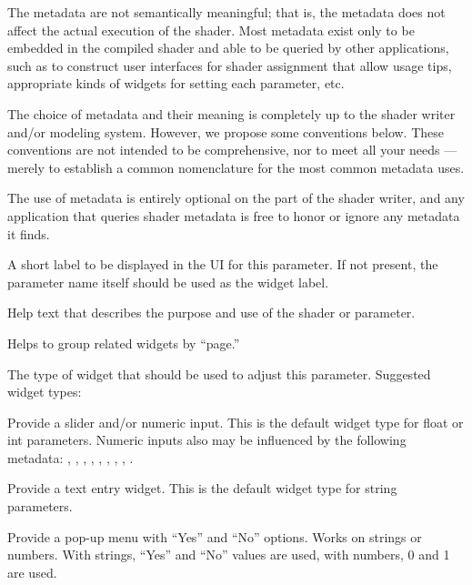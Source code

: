\documentclass[11pt,letterpaper]{book}
\begin{document}
The metadata are not semantically meaningful; that is, the metadata does
not affect the actual execution of the shader.  Most metadata exist only
to be embedded in the compiled shader and able to be queried by other
applications, such as to construct user interfaces for shader assignment
that allow usage tips, appropriate kinds of widgets for setting each
parameter, etc.  

The choice of metadata and their meaning is completely up to the shader
writer and/or modeling system.  However, we propose some conventions
below.  These conventions are not intended to be comprehensive, nor to
meet all your needs --- merely to establish a common nomenclature for
the most common metadata uses.

The use of metadata is entirely optional on the part of the shader
writer, and any application that queries shader metadata is free to
honor or ignore any metadata it finds.

A short label to be displayed in the UI for this parameter.  If not
present, the parameter name itself should be used as the widget label.
\apiend

Help text that describes the purpose and use of the shader or parameter.
\apiend

Helps to group related widgets by ``page.''
\apiend

The type of widget that should be used to adjust this parameter.
Suggested widget types:

\vspace{12pt}
Provide a slider and/or numeric input. This is the default widget type
for {\cf float} or {\cf int} parameters.  Numeric inputs also may be
influenced by the following metadata: , ,
, , , ,
, , .
\apiend
\vspace{-16pt}

\vspace{12pt}
Provide a text entry widget. This is the default widget type for
{\cf string} parameters.
\apiend
\vspace{-16pt}

\vspace{12pt}
Provide a pop-up menu with ``Yes'' and ``No'' options. Works on strings
or numbers.  With strings, ``Yes'' and ``No'' values are used, with
numbers, 0 and 1 are used.
\apiend
\vspace{-16pt}
\end{document}
